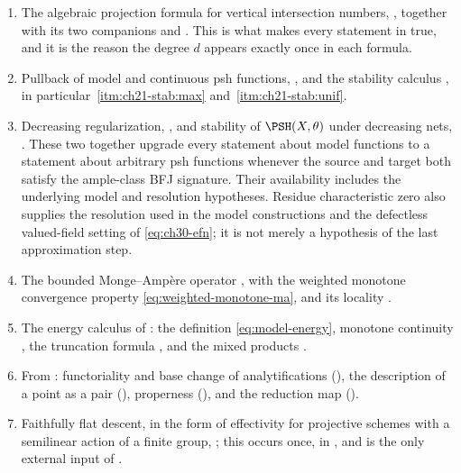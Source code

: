 \begin{enumerate}
\item\label{itm:ch30-import:projection}
The algebraic projection formula for vertical intersection numbers,
, together with its two companions
 and .  This
is what makes every statement in
 true, and it is the reason the
degree $d$ appears exactly once in each formula.

\item\label{itm:ch30-import:pullback}
Pullback of model and continuous psh functions,
, and the stability calculus
, in particular
\,\cref{itm:ch21-stab:max} and
\,\cref{itm:ch21-stab:unif}.

\item\label{itm:ch30-import:regularization}
Decreasing regularization, , and
stability of $\PSH(X,\theta)$ under decreasing nets,
.  These two together upgrade every
statement about model functions to a statement about arbitrary psh
functions whenever the source and target both satisfy the ample-class BFJ
signature.  Their availability includes the underlying model and resolution
hypotheses.  Residue characteristic zero also supplies the resolution
used in the model constructions and the defectless valued-field setting
of \eqref{eq:ch30-efn}; it is not merely a hypothesis of the last
approximation step.

\item\label{itm:ch30-import:ma}
The bounded Monge--Amp\`ere operator ,
with the weighted monotone convergence property
\eqref{eq:weighted-monotone-ma}, and its locality
.

\item\label{itm:ch30-import:energy}
The energy calculus of : the definition
\eqref{eq:model-energy}, monotone continuity
, the truncation formula
, and the mixed products
.

\item\label{itm:ch30-import:analytic}
From : functoriality and base change of
analytifications (), the description of a point
as a pair (), properness
(), and the reduction map
().

\item\label{itm:ch30-import:descent}
Faithfully flat descent, in the form of effectivity for projective schemes
with a semilinear action of a finite group, \cite[Exp.~VIII]{SGA1}; this
occurs once, in , and is the only external
input of .
\end{enumerate}

